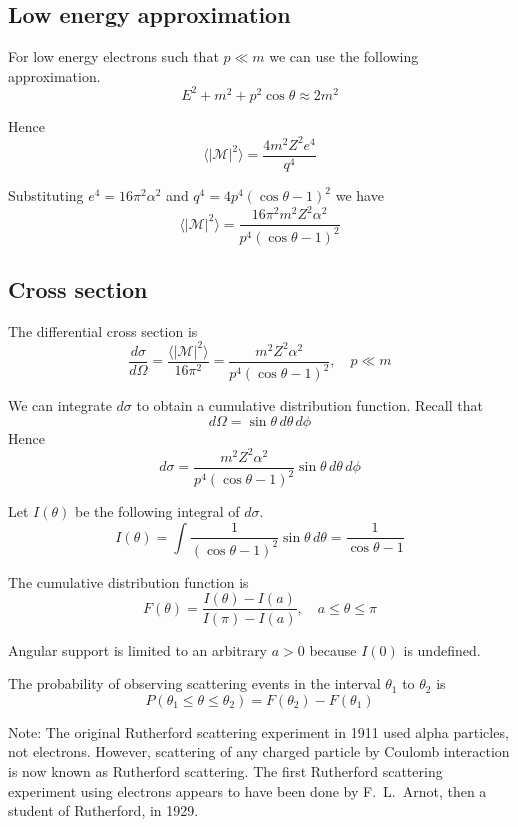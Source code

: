 \documentclass[12pt]{article}
\begin{document}
\subsection*{Low energy approximation}
For low energy electrons such that $p\ll m$ we can use the following approximation.
\begin{equation*}
E^2+m^2+p^2\cos\theta\approx2m^2
\end{equation*}

\noindent
Hence
\begin{equation*}
\langle|\mathcal{M}|^2\rangle=\frac{4m^2Z^2e^4}{q^4}
\end{equation*}

\noindent
Substituting $e^4=16\pi^2\alpha^2$ and $q^4=4p^4(\cos\theta-1)^2$ we have
\begin{equation*}
\langle|\mathcal{M}|^2\rangle=\frac{16\pi^2m^2Z^2\alpha^2}{p^4(\cos\theta-1)^2}
\end{equation*}

\subsection*{Cross section}
The differential cross section is
\begin{equation*}
\frac{d\sigma}{d\Omega}=\frac{\langle|\mathcal{M}|^2\rangle}{16\pi^2}
=\frac{m^2Z^2\alpha^2}{p^4(\cos\theta-1)^2},
\quad
p\ll m
\end{equation*}

\noindent
We can integrate $d\sigma$ to obtain a cumulative distribution function.
Recall that
\begin{equation*}
d\Omega=\sin\theta\,d\theta\,d\phi
\end{equation*}
Hence
\begin{equation*}
d\sigma=\frac{m^2Z^2\alpha^2}{p^4(\cos\theta-1)^2}\sin\theta\,d\theta\,d\phi
\end{equation*}

\noindent
Let $I(\theta)$ be the following integral of $d\sigma$.
\begin{equation*}
I(\theta)
=\int\frac{1}{(\cos\theta-1)^2}\sin\theta\,d\theta
=\frac{1}{\cos\theta-1}
\end{equation*}

The cumulative distribution function is
\begin{equation*}
F(\theta)=\frac{I(\theta)-I(a)}{I(\pi)-I(a)},
\quad
a\le\theta\le\pi
\end{equation*}

Angular support is limited to an arbitrary $a>0$ because $I(0)$ is undefined.

\bigskip
The probability of observing scattering events
in the interval $\theta_1$ to $\theta_2$ is
\begin{equation*}
P(\theta_1\le\theta\le\theta_2)=F(\theta_2)-F(\theta_1)
\end{equation*}

\noindent
Note:
The original Rutherford scattering experiment in 1911 used alpha particles, not electrons.
However, scattering of any charged particle by Coulomb interaction
is now known as Rutherford scattering.
The first Rutherford scattering experiment using electrons appears to have
been done by F.~L.~Arnot, then a student of Rutherford, in 1929.
\end{document}
